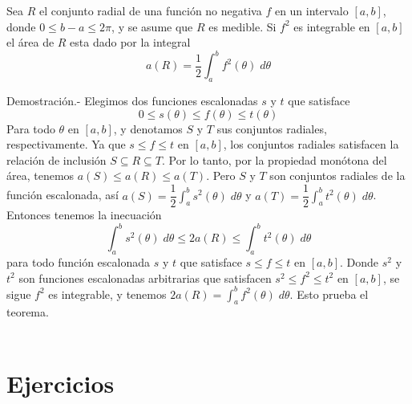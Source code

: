 \begin{teo}
    Sea $R$ el conjunto radial de una función no negativa $f$ en un intervalo $[a,b]$, donde $0\leq b-a\leq 2\pi$, y se asume que $R$ es medible. Si $f^2$ es integrable en $[a,b]$ el área de $R$ esta dado por la integral
    $$a(R)= \dfrac{1}{2}\int_a^b f^2(\theta)\; d\theta$$

    Demostración.-\; Elegimos dos funciones escalonadas $s$ y $t$ que satisface
    $$0\leq s(\theta) \leq f(\theta)\leq t(\theta)$$
    Para todo $\theta$ en $[a,b]$, y denotamos $S$ y $T$ sus conjuntos radiales, respectivamente. Ya que $s\leq f\leq t$ en $[a,b]$, los conjuntos radiales satisfacen la relación de inclusión $S\subseteq R \subseteq T.$ Por lo tanto, por la propiedad monótona del área, tenemos $a(S)\leq a(R) \leq a(T).$ Pero $S$ y $T$ son conjuntos radiales de la función escalonada, así $a(S) = \dfrac{1}{2}\displaystyle\int_a^b s^2(\theta)\; d\theta$ y $a(T) = \dfrac{1}{2}\displaystyle\int_a^b t^2 (\theta)\; d\theta$. Entonces tenemos la inecuación 
    $$\int_a^b s^2(\theta)\; d\theta \leq 2a(R)\leq \int_a^b t^2(\theta)\; d\theta$$
    para todo función escalonada $s$ y $t$ que satisface $s\leq f\leq t$ en $[a,b]$. Donde $s^2$ y $t^2$ son funciones escalonadas arbitrarias que satisfacen $s^2\leq f^2 \leq t^2$ en $[a,b]$, se sigue $f^2$ es integrable, y tenemos $2a(R)=\displaystyle\int_a^b f^2(\theta)\; d\theta$. Esto prueba el teorema.\\\\
\end{teo}


\section{Ejercicios}

